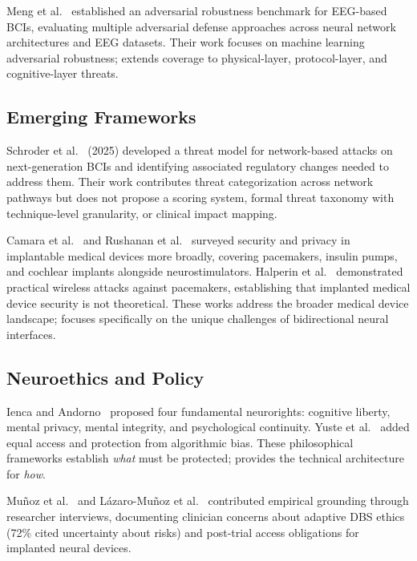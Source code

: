 Meng et al.~\cite{meng2023adversarial} established an adversarial robustness
benchmark for EEG-based BCIs, evaluating multiple adversarial defense approaches
across neural network architectures and EEG datasets. Their work focuses on
machine learning adversarial robustness; \tara extends coverage to physical-layer,
protocol-layer, and cognitive-layer threats.

\subsection{Emerging Frameworks}

Schroder et al.~\cite{schroder2025cyberrisks} (2025) developed a threat model for network-based attacks on next-generation BCIs
and identifying associated regulatory changes needed to address them. Their work
contributes threat categorization across network pathways but does not propose a
scoring system, formal threat taxonomy with technique-level granularity, or clinical
impact mapping.

Camara et al.~\cite{camara2015security} and Rushanan et al.~\cite{rushanan2014sok}
surveyed security and privacy in implantable medical devices more broadly, covering
pacemakers, insulin pumps, and cochlear implants alongside neurostimulators.
Halperin et al.~\cite{halperin2008pacemakers} demonstrated practical wireless
attacks against pacemakers, establishing that implanted medical device security is
not theoretical. These works address the broader medical device landscape; \qif
focuses specifically on the unique challenges of bidirectional neural interfaces.

\subsection{Neuroethics and Policy}

Ienca and Andorno~\cite{ienca2017neurorights} proposed four fundamental neurorights:
cognitive liberty, mental privacy, mental integrity, and psychological continuity.
Yuste et al.~\cite{yuste2017four} added equal access and protection from
algorithmic bias. These philosophical frameworks establish \emph{what} must be
protected; \qif provides the technical architecture for \emph{how}.

Muñoz et al.~\cite{lazaro2020researcher} and Lázaro-Muñoz et al.~\cite{lazaro2022posttrial} contributed
empirical grounding through researcher interviews, documenting clinician concerns
about adaptive DBS ethics (72\% cited uncertainty about risks) and post-trial
access obligations for implanted neural devices.


